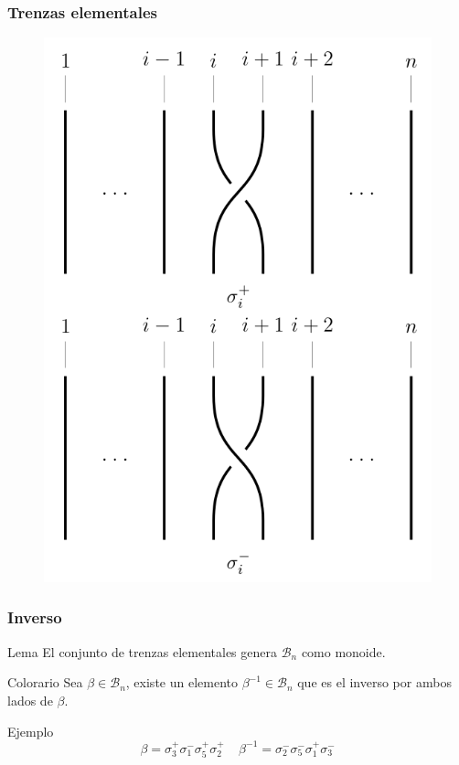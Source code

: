 \documentclass{beamer}
\begin{document}
\begin{frame}
\frametitle{Trenzas elementales}


\begin{figure}
\includegraphics[scale=0.23]{imgs/imgs_trenzas/trenzas_elementales}
\end{figure}

\end{frame}

\begin{frame}
\frametitle{Inverso}

\begin{block}{Lema}
El conjunto de trenzas elementales genera $\mathcal{B}_n$ como monoide.
\end{block}

\begin{block}{Colorario}
Sea $\beta\in\mathcal{B}_n$, existe un elemento $\beta^{-1}\in\mathcal{B}_n$ que es el inverso por ambos lados de $\beta$.
\end{block}

\begin{exampleblock}{Ejemplo}
$$\beta = \sigma_3^+\sigma_1^-\sigma_5^+\sigma_2^+\ \ \ \ \ \beta^{-1}=\sigma_2^-\sigma_5^-\sigma_1^+\sigma_3^-$$
\end{exampleblock}

\end{frame}
\end{document}
